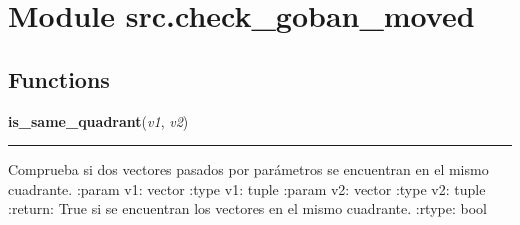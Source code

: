 %
%
%


\section{Module src.check\_goban\_moved}

    \label{src:check_goban_moved}


  \subsection{Functions}

    \label{src:check_goban_moved:is_same_quadrant}

    \vspace{0.5ex}

\hspace{.8\funcindent}\begin{boxedminipage}{\funcwidth}

    \raggedright \textbf{is\_same\_quadrant}(\textit{v1}, \textit{v2})

    \vspace{-1.5ex}

    \rule{\textwidth}{0.5\fboxrule}
\setlength{\parskip}{2ex}
    Comprueba si dos vectores pasados por parámetros se encuentran en el 
    mismo cuadrante. :param v1: vector :type v1: tuple :param v2: vector 
    :type v2: tuple :return: True si se encuentran los vectores en el mismo
    cuadrante. :rtype: bool

\setlength{\parskip}{1ex}
    \end{boxedminipage}

    \label{src:check_goban_moved:degress_between_two_vectors}

